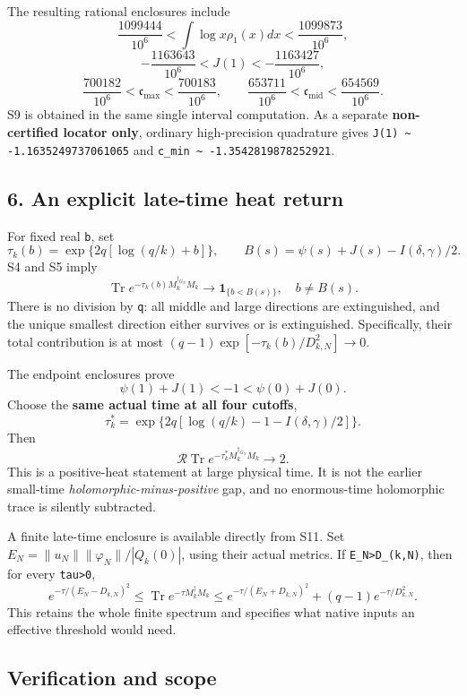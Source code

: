 The resulting rational enclosures include \[
 \frac{1099444}{10^6}<\int\log x\rho_1(x)dx<\frac{1099873}{10^6},
\] \[
 -\frac{1163643}{10^6}<J(1)<-\frac{1163427}{10^6},
\] \[
 \frac{700182}{10^6}<\mathfrak c_{\max}<\frac{700183}{10^6},\qquad
 \frac{653711}{10^6}<\mathfrak c_{\mathrm{mid}}<\frac{654569}{10^6}.
\] S9 is obtained in the same single interval computation. As a separate \textbf{non-certified locator only}, ordinary high-precision quadrature gives \nolinkurl{J(1) ~ -1.1635249737061065} and \nolinkurl{c_min ~ -1.3542819878252921}.

\subsection{6. An explicit late-time heat return}\label{an-explicit-late-time-heat-return}

For fixed real \texttt{b}, set \[
 \tau_k(b)=\exp\{2q[\log(q/k)+b]\},\qquad
 B(s)=\psi(s)+J(s)-I(\delta,\gamma)/2.
\] S4 and S5 imply \[
 \boxed{\operatorname{Tr}e^{-\tau_k(b)M_k^{\dagger_{G_N}}M_k}
 \longrightarrow \mathbf1_{\{b<B(s)\}},\quad b\ne B(s).}           \tag{S42}
\] There is no division by \texttt{q}: all middle and large directions are extinguished, and the unique smallest direction either survives or is extinguished. Specifically, their total contribution is at most \((q-1)\exp[-\tau_k(b)/D_{k,N}^2]\to0\).

The endpoint enclosures prove \[
 \psi(1)+J(1)<-1<\psi(0)+J(0).
\] Choose the \textbf{same actual time at all four cutoffs}, \[
 \boxed{\tau_k^*=\exp\{2q[\log(q/k)-1-I(\delta,\gamma)/2]\}.}     \tag{S43}
\] Then \[
 \boxed{\mathcal R\operatorname{Tr}
 e^{-\tau_k^*M_k^{\dagger_{G_N}}M_k}\longrightarrow2.}             \tag{S44}
\] This is a positive-heat statement at large physical time. It is not the earlier small-time \emph{holomorphic-minus-positive} gap, and no enormous-time holomorphic trace is silently subtracted.

A finite late-time enclosure is available directly from S11. Set \(E_N=\|u_N\|\|\varphi_N\|/|Q_k(0)|\), using their actual metrics. If \texttt{E\_N\textgreater{}D\_(k,N)}, then for every \texttt{tau\textgreater{}0}, \[
 e^{-\tau/(E_N-D_{k,N})^2}
 \le \operatorname{Tr}e^{-\tau M_k^\dagger M_k}
 \le e^{-\tau/(E_N+D_{k,N})^2}
       +(q-1)e^{-\tau/D_{k,N}^2}.                                \tag{S45}
\] This retains the whole finite spectrum and specifies what native inputs an effective threshold would need.

\subsection{Verification and scope}\label{verification-and-scope}

